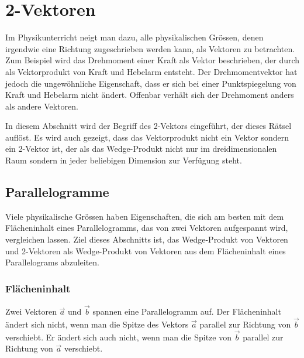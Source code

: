 %
%
\section{2-Vektoren
\label{buch:green:section:2vektoren}}
Im Physikunterricht neigt man dazu, alle physikalischen Grössen,
denen irgendwie eine Richtung zugeschrieben werden kann, als
Vektoren zu betrachten.
Zum Beispiel wird das Drehmoment einer Kraft als Vektor beschrieben,
der durch als Vektorprodukt von Kraft und Hebelarm entsteht.
Der Drehmomentvektor hat jedoch die ungewöhnliche Eigenschaft, dass
er sich bei einer Punktspiegelung von Kraft und Hebelarm nicht ändert.
Offenbar verhält sich der Drehmoment anders als andere Vektoren.

In diesem Abschnitt wird der Begriff des 2-Vektors eingeführt, der
dieses Rätsel auflöst.
Es wird auch gezeigt, dass das Vektorprodukt nicht ein Vektor sondern
ein 2-Vektor ist, der als das Wedge-Produkt nicht nur im dreidimensionalen
Raum sondern in jeder beliebigen Dimension zur Verfügung steht.

%
%
\subsection{Parallelogramme}
Viele physikalische Grössen haben Eigenschaften, die sich am besten
mit dem Flächeninhalt eines Parallelogramms, das von zwei Vektoren
aufgespannt wird, vergleichen lassen.
Ziel dieses Abschnitts ist, das Wedge-Produkt von Vektoren und 
2-Vektoren als Wedge-Produkt von Vektoren aus dem Flächeninhalt
eines Parallelograms abzuleiten.

%
%
\subsubsection{Flächeninhalt}

Zwei Vektoren $\vec{a}$ und $\vec{b}$ spannen eine Parallelogramm auf.
Der Flächeninhalt ändert sich nicht, wenn man die Spitze des Vektors
$\vec{a}$ parallel zur Richtung von $\vec{b}$ verschiebt.
Er ändert sich auch nicht, wenn man die Spitze von $\vec{b}$ parallel
zur Richtung von $\vec{a}$ verschiebt.


